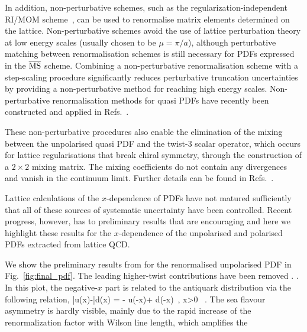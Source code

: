 \begin{itemize}
In addition, non-perturbative schemes, such as the regularization-independent RI/MOM scheme~\cite{Martinelli:1994ty}, can be used to renormalise matrix elements determined on the lattice. Non-perturbative schemes avoid the use of lattice perturbation theory at low energy scales (usually chosen to be $\mu = \pi/a$), although perturbative matching between renormalisation schemes is still necessary for PDFs expressed in the $\overline{\rm MS}$ scheme. Combining a non-perturbative renormalisation scheme with a step-scaling procedure \cite{Luscher:1991wu} significantly reduces perturbative truncation uncertainties by providing a non-perturbative method for reaching high energy scales. 
Non-perturbative renormalisation methods for quasi PDFs have recently been constructed and applied in Refs.~\cite{Alexandrou:2017huk,Chen:2017mzz}.

These non-perturbative procedures also enable the elimination of the mixing between the unpolarised quasi PDF and the 
twist-3 scalar operator, which occurs for lattice regularisations that break chiral symmetry, through the construction of a $2\times2$ mixing matrix. The mixing coefficients 
do not contain any divergences and vanish in the continuum limit. Further details can be found in
Refs.~\cite{Alexandrou:2017huk,Chen:2017mzz}. 
\end{itemize}

Lattice calculations of the $x$-dependence of PDFs have not matured sufficiently that all of these sources of systematic uncertainty have been controlled. Recent progress, however, has  to preliminary results that are encouraging and here we highlight these results for the $x$-dependence
of the unpolarised and polarised PDFs extracted from lattice QCD. 

We show the preliminary results from \cite{Chen:2017mzz} for the renormalised unpolarised PDF in Fig.~\ref{fig:final_pdf}. 
The leading higher-twist contributions have been removed \cite{Chen:2016utp}. . In this plot, the negative-$x$ part is related to the antiquark distribution via
the following relation,
\be
\bar{u}(x)-\bar{d}(x) = - u(-x)+ d(-x)\, , \quad x>0 \, .
\ee
The sea flavour asymmetry is hardly visible,
mainly due to the rapid increase 
of the renormalization factor with Wilson line length, which amplifies the 


